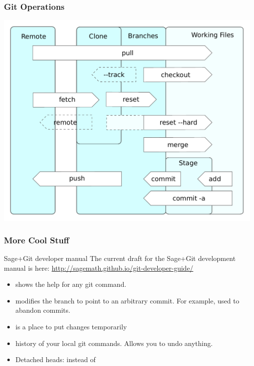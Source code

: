 \documentclass[11pt,handout]{beamer}
\begin{document}
\begin{frame}[plain]
  \frametitle{Git Operations}
  \centering
  \includegraphics[width=0.85\linewidth]{images/git_operations}
\end{frame}



\begin{frame}
  \frametitle{More Cool Stuff}
  
  \begin{block}{Sage+Git developer manual}
    The current draft for the Sage+Git development manual is here:
    \url{http://sagemath.github.io/git-developer-guide/}
  \end{block}

  \begin{itemize}
  \item {} shows the help for any git command.
  \item {} modifies the branch to point to an arbitrary
    commit. For example, used to abandon commits.
  \item {} is a place to put changes temporarily
  \item {} history of your local git commands. Allows
    you to undo anything.
  \item Detached heads:  instead of 
  \end{itemize}
\end{frame}
\end{document}
